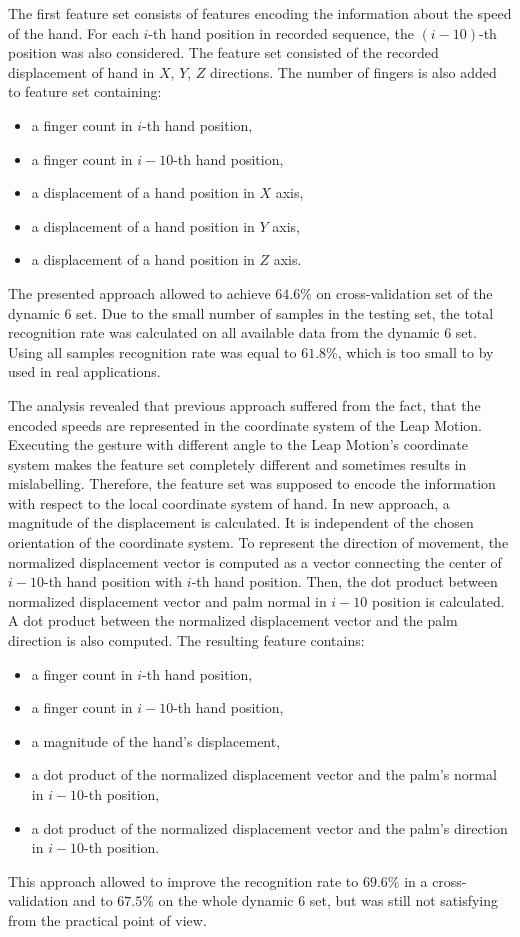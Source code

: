The first feature set consists of features encoding the information about the speed of the hand. 
For each $i$-th hand position in recorded sequence, the $(i-10)$-th position was also considered. 
The feature set consisted of the recorded displacement of hand in $X$, $Y$, $Z$ directions.
The number of fingers is also added to feature set containing:
\begin{itemize}
\item a finger count in $i$-th hand position,
\item a finger count in $i-10$-th hand position,
\item a displacement of a hand position in $X$ axis,
\item a displacement of a hand position in $Y$ axis,
\item a displacement of a hand position in $Z$ axis.
\end{itemize}
The presented approach allowed to achieve $64.6\%$ on cross-validation set of the dynamic 6 set. 
Due to the small number of samples in the testing set, the total recognition rate was calculated on all available data from the dynamic 6 set.
Using all samples recognition rate was equal to $61.8\%$, which is too small to by used in real applications.

The analysis revealed that previous approach suffered from the fact, that the encoded speeds are represented in the coordinate system of the Leap Motion.
Executing the gesture with different angle to the Leap Motion's coordinate system makes the feature set completely different and sometimes results in mislabelling.
Therefore, the feature set was supposed to encode the information with respect to the local coordinate system of hand. 
In new approach, a magnitude of the displacement is calculated. 
It is independent of the chosen orientation of the coordinate system.
To represent the direction of movement, the normalized displacement vector is computed as a vector connecting the center of $i-10$-th hand position with $i$-th hand position.
Then, the dot product between normalized displacement vector and palm normal in $i-10$ position is calculated.
A dot product between the normalized displacement vector and the palm direction is also computed.
The resulting feature contains:
\begin{itemize}
\item a finger count in $i$-th hand position,
\item a finger count in $i-10$-th hand position,
\item a magnitude of the hand's displacement,
\item a dot product of the normalized displacement vector and the palm's normal in $i-10$-th position,
\item a dot product of the normalized displacement vector and the palm's direction in $i-10$-th position.
\end{itemize}
This approach allowed to improve the recognition rate to $69.6\%$ in a cross-validation and to $67.5\%$ on the whole dynamic 6 set, but was still not satisfying from the practical point of view.


